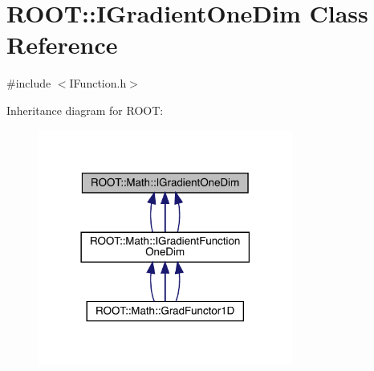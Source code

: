 \hypertarget{classROOT_1_1Math_1_1IGradientOneDim}{}\section{R\+O\+OT\+:\+:I\+Gradient\+One\+Dim Class Reference}
\label{classROOT_1_1Math_1_1IGradientOneDim}


{\ttfamily \#include $<$I\+Function.\+h$>$}



Inheritance diagram for R\+O\+OT\+:
\nopagebreak
\begin{figure}[H]
\begin{center}
\leavevmode
\includegraphics[width=237pt]{d9/de4/classROOT_1_1Math_1_1IGradientOneDim__inherit__graph}
\end{center}
\end{figure}
